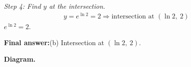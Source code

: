 \documentclass[11pt]{article}
\begin{document}
\textit{Step 4: Find \( y \) at the intersection.}
\[\begin{gathered}
y = e^{\ln 2} = 2 \Rightarrow \text{intersection at } (\ln 2,\ 2)
\end{gathered}\]
\( e^{\ln 2} = 2 \).

\begin{answerbox}
\textbf{Final answer:}\quad (b) Intersection at \(\displaystyle  (\ln 2,\ 2) \).
\end{answerbox}
\textbf{Diagram.}

\begin{center}
\end{center}
\end{document}
